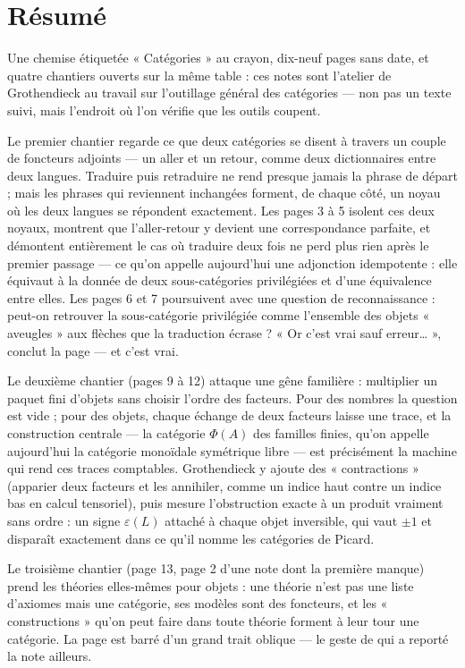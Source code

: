 \documentclass[11pt,a4paper]{article}
\begin{document}
\section*{Résumé}

\begin{resume}
Une chemise étiquetée « Catégories » au crayon, dix-neuf pages sans
date, et quatre chantiers ouverts sur la même table : ces notes sont
l'atelier de Grothendieck au travail sur l'outillage général des catégories
— non pas un texte suivi, mais l'endroit où l'on vérifie que les outils
coupent.

Le premier chantier regarde ce que deux catégories se disent à travers un
couple de foncteurs adjoints — un aller et un retour, comme deux
dictionnaires entre deux langues. Traduire puis retraduire ne rend presque
jamais la phrase de départ ; mais les phrases qui reviennent inchangées
forment, de chaque côté, un noyau où les deux langues se répondent
exactement. Les pages 3 à 5 isolent ces deux noyaux, montrent que
l'aller-retour y devient une correspondance parfaite, et démontent
entièrement le cas où traduire deux fois ne perd plus rien après le premier
passage — ce qu'on appelle aujourd'hui une adjonction idempotente : elle
équivaut à la donnée de deux sous-catégories privilégiées et d'une
équivalence entre elles. Les pages 6 et 7 poursuivent avec une question
de reconnaissance : peut-on retrouver la sous-catégorie privilégiée comme
l'ensemble des objets « aveugles » aux flèches que la traduction écrase ?
« Or c'est vrai sauf erreur… », conclut la page — et c'est vrai.

Le deuxième chantier (pages 9 à 12) attaque une gêne familière :
multiplier un paquet fini d'objets sans choisir l'ordre des facteurs. Pour
des nombres la question est vide ; pour des objets, chaque échange de deux
facteurs laisse une trace, et la construction centrale — la catégorie
$\Phi(A)$ des familles finies, qu'on appelle aujourd'hui la catégorie
monoïdale symétrique libre — est précisément la machine qui rend ces traces
comptables. Grothendieck y ajoute des « contractions » (apparier deux
facteurs et les annihiler, comme un indice haut contre un indice bas en
calcul tensoriel), puis mesure l'obstruction exacte à un produit vraiment
sans ordre : un signe $\varepsilon(L)$ attaché à chaque objet inversible,
qui vaut $\pm 1$ et disparaît exactement dans ce qu'il nomme les catégories
de Picard.

Le troisième chantier (page 13, page 2 d'une note dont la première
manque) prend les théories elles-mêmes pour objets : une théorie n'est pas
une liste d'axiomes mais une catégorie, ses modèles sont des foncteurs, et
les « constructions » qu'on peut faire dans toute théorie forment à leur
tour une catégorie. La page est barré d'un grand trait oblique — le
geste de qui a reporté la note ailleurs.


\end{resume}
\end{document}
